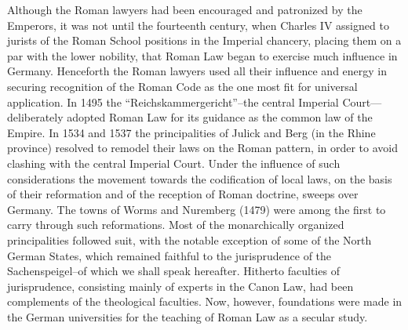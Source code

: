 \documentclass{book}
\begin{document}
Although the Roman lawyers had been encouraged and patronized by the Emperors, it was not until the fourteenth century, when Charles IV assigned to jurists of the Roman School positions in the Imperial chancery, placing them on a par with the lower nobility, that Roman Law began to exercise much influence in Germany. Henceforth the Roman lawyers used all their influence and energy in securing recognition of the Roman Code as the one most fit for universal application. In 1495 the “Reichskammergericht”–the central Imperial Court—deliberately adopted Roman Law for its guidance as the common law of the Empire. In 1534 and 1537 the principalities of Julick and Berg (in the Rhine province) resolved to remodel their laws on the Roman pattern, in order to avoid clashing with the central Imperial Court. Under the influence of such considerations the movement towards the codification of local laws, on the basis of their reformation and of the reception of Roman doctrine, sweeps over Germany. The towns of Worms and Nuremberg (1479) were among the first to carry through such reformations. Most of the monarchically organized principalities followed suit, with the notable exception of some of the North German States, which remained faithful to the jurisprudence of the Sachenspeigel\footnotemark[5]–of which we shall speak hereafter. Hitherto faculties of jurisprudence, consisting mainly of experts in the Canon Law, had been complements of the theological faculties. Now, however, foundations were made in the German universities for the teaching of Roman Law as a secular study.
\end{document}
